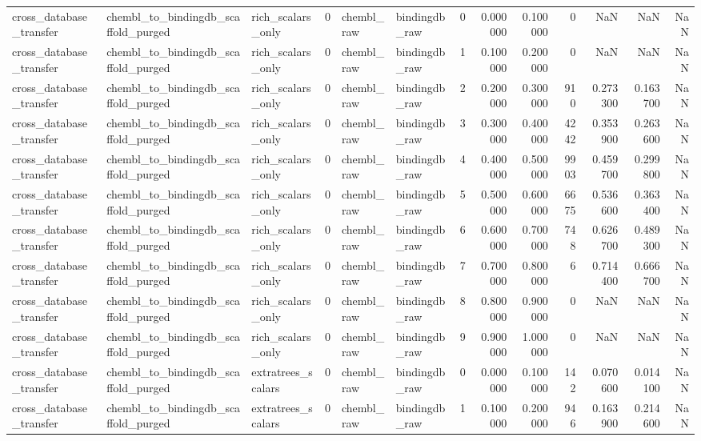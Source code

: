 \begin{longtable}{lllrllrrrrrrr}
cross\_database\_transfer & chembl\_to\_bindingdb\_scaffold\_purged & rich\_scalars\_only & 0 & chembl\_raw & bindingdb\_raw & 0 & 0.000000 & 0.100000 & 0 & NaN & NaN & NaN \\
cross\_database\_transfer & chembl\_to\_bindingdb\_scaffold\_purged & rich\_scalars\_only & 0 & chembl\_raw & bindingdb\_raw & 1 & 0.100000 & 0.200000 & 0 & NaN & NaN & NaN \\
cross\_database\_transfer & chembl\_to\_bindingdb\_scaffold\_purged & rich\_scalars\_only & 0 & chembl\_raw & bindingdb\_raw & 2 & 0.200000 & 0.300000 & 910 & 0.273300 & 0.163700 & NaN \\
cross\_database\_transfer & chembl\_to\_bindingdb\_scaffold\_purged & rich\_scalars\_only & 0 & chembl\_raw & bindingdb\_raw & 3 & 0.300000 & 0.400000 & 4242 & 0.353900 & 0.263600 & NaN \\
cross\_database\_transfer & chembl\_to\_bindingdb\_scaffold\_purged & rich\_scalars\_only & 0 & chembl\_raw & bindingdb\_raw & 4 & 0.400000 & 0.500000 & 9903 & 0.459700 & 0.299800 & NaN \\
cross\_database\_transfer & chembl\_to\_bindingdb\_scaffold\_purged & rich\_scalars\_only & 0 & chembl\_raw & bindingdb\_raw & 5 & 0.500000 & 0.600000 & 6675 & 0.536600 & 0.363400 & NaN \\
cross\_database\_transfer & chembl\_to\_bindingdb\_scaffold\_purged & rich\_scalars\_only & 0 & chembl\_raw & bindingdb\_raw & 6 & 0.600000 & 0.700000 & 748 & 0.626700 & 0.489300 & NaN \\
cross\_database\_transfer & chembl\_to\_bindingdb\_scaffold\_purged & rich\_scalars\_only & 0 & chembl\_raw & bindingdb\_raw & 7 & 0.700000 & 0.800000 & 6 & 0.714400 & 0.666700 & NaN \\
cross\_database\_transfer & chembl\_to\_bindingdb\_scaffold\_purged & rich\_scalars\_only & 0 & chembl\_raw & bindingdb\_raw & 8 & 0.800000 & 0.900000 & 0 & NaN & NaN & NaN \\
cross\_database\_transfer & chembl\_to\_bindingdb\_scaffold\_purged & rich\_scalars\_only & 0 & chembl\_raw & bindingdb\_raw & 9 & 0.900000 & 1.000000 & 0 & NaN & NaN & NaN \\
cross\_database\_transfer & chembl\_to\_bindingdb\_scaffold\_purged & extratrees\_scalars & 0 & chembl\_raw & bindingdb\_raw & 0 & 0.000000 & 0.100000 & 142 & 0.070600 & 0.014100 & NaN \\
cross\_database\_transfer & chembl\_to\_bindingdb\_scaffold\_purged & extratrees\_scalars & 0 & chembl\_raw & bindingdb\_raw & 1 & 0.100000 & 0.200000 & 946 & 0.163900 & 0.214600 & NaN \\

\end{longtable}

